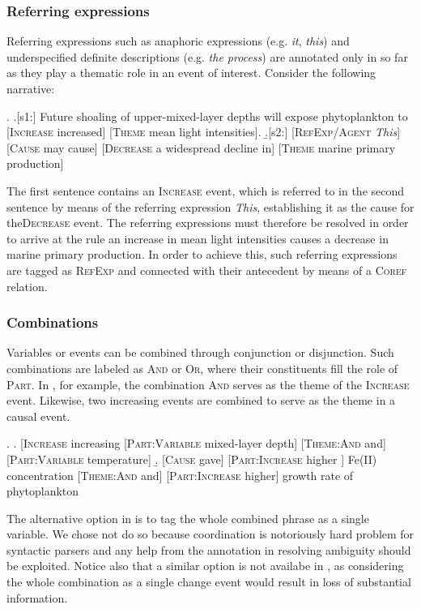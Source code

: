 \documentclass[10pt, a4paper]{article}
\newcommand{\tag}[1]{\textsc{#1}}
\begin{document}
\subsubsection{Referring expressions}

Referring expressions such as anaphoric expressions (e.g. \emph{it}, \emph{this}) and underspecified definite descriptions (e.g. \emph{the process}) are annotated only in so far as they play a thematic role in an event of interest. Consider the following narrative:

\exi. 
  \a.[s1:] Future shoaling of upper-mixed-layer depths will expose phytoplankton to [\tag{Increase} increased] [\tag{Theme} mean light intensities].
  \b.[s2:] [\tag{RefExp/Agent} \emph{This}] [\tag{Cause} may cause] [\tag{Decrease} a widespread decline in] [\tag{Theme} marine primary production]

The first sentence contains an \tag{Increase} event, which is referred to in the second sentence by means of the referring expression \emph{This}, establishing it as the cause for the\tag{Decrease} event.
The referring expressions must therefore be resolved in order to arrive at the rule an increase in mean light intensities causes a decrease in marine primary production.
In order to achieve this, such referring expressions are tagged as \tag{RefExp} and connected with their antecedent by means of a \tag{Coref} relation. 
  

\subsubsection{Combinations}

Variables or events can be combined through conjunction or disjunction.
Such combinations are labeled as \tag{And} or \tag{Or}, where their constituents fill the role of \tag{Part}.
In \Next[a], for example, the combination \tag{And} serves as the theme of the \tag{Increase} event.
Likewise, two increasing events are combined to serve as the theme in a causal event.

\exi.
  \a. [\tag{Increase} increasing [\tag{Part:Variable} mixed-layer depth] [\tag{Theme:And} and] [\tag{Part:Variable} temperature]  
  \b. [\tag{Cause} gave] [\tag{Part:Increase} higher ] Fe(II) concentration [\tag{Theme:And} and] [\tag{Part:Increase} higher] growth rate of phytoplankton

The alternative option in \Last[a] is to tag the whole combined phrase as a single variable.
We chose not do so because coordination is notoriously hard problem for syntactic parsers and any help from the annotation in resolving ambiguity should be exploited.
Notice also that a similar option is not availabe in \Last[b], as considering the whole combination as a single change event would result in loss of substantial information.
\end{document}
